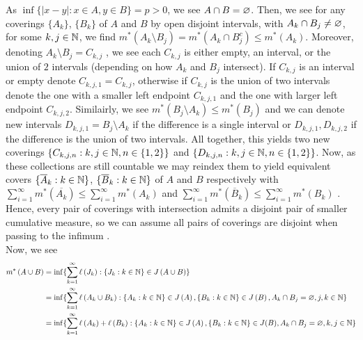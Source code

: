 \documentclass[a4paper]{article}
\begin{document}
\begin{solution}[28]
	As \(\inf \{ \left| x-y \right|  : x \in A, y \in B \} = p > 0\), we see \(A \cap B = \varnothing\). Then, we see for any coverings \(\{A_{k}\} \), \(\{B_{k}\} \) of \(A\) and \(B\) by open disjoint intervals, with \(A_{k} \cap B_{j} \neq \varnothing\), for some \(k, j \in \mathbb{N}\), we find \(m^{*}\left( A_{k} \setminus B_{j} \right)  = m^{*}\left( A_{k} \cap B_{j}^{c} \right)  \le m^{*}\left( A_{k} \right)   \). Moreover, denoting \(A_{k} \setminus B_{j} = C_{k,j}\) , we see each \(C_{k, j}\) is either empty, an interval, or the union of \(2\) intervals (depending on how \(A_{k}\) and \(B_{j}\) intersect). If \(C_{k, j}\) is an interval or empty denote \(C_{k, j, 1} = C_{k, j}\), otherwise if \(C_{k, j}\) is the union of two intervals denote the one with a smaller left endpoint \(C_{k, j, 1}\) and the one with larger left endpoint \(C_{k, j, 2}\). Similairly, we see \(m^{*}\left( B_{j} \setminus A_{k} \right) \le m^{*}\left( B_{j} \right) \) and we can denote new intervals \(D_{k, j, 1} = B_{j} \setminus A_{k}\) if the difference is a single interval or \(D_{k, j, 1}, D_{k, j, 2}\) if the difference is the union of two intervals. All together, this yields two new coverings \(\{C_{k, j, n} : k, j \in \mathbb{N}, n \in \{1, 2\} \}\) and \( \{D_{k, j, n} : k, j \in \mathbb{N}, n \in \{1, 2\} \}  \). Now, as these collections are still countable we may reindex them to yield equivalent covers \(\{\overline{A}_{k} : k \in \mathbb{N}\} \), \(\{\overline{B}_{k} : k \in \mathbb{N}\} \) of \(A\) and \(B\) respectively  with \(\sum_{i= 1}^{\infty} m^{*}(\overline{A_{k}}) \le \sum_{i= 1}^{\infty} m^{*}(A_{k})\)  and \(\sum_{i= 1}^{\infty} m^{*}\left( \overline{B}_{k} \right) \le \sum_{i= 1}^{\infty} m^{*}\left( B_{k} \right) \) . Hence, every pair of coverings with intersection admits a disjoint pair of smaller cumulative measure, so we can assume all pairs of coverings are disjoint when passing to the infimum .\\
	Now, we see
	\begin{align*}
		m^{*}\left( A \cup B \right) &=  \inf \{ \sum_{k= 1}^{\infty} \ell\left( J_{k} \right)  : \{J_{k} : k \in \N\} \in J\left( A \cup B \right)   \}  \\
					     &= \inf \{ \sum_{k= 1}^{\infty} \ell\left( A_{k} \cup B_{k} \right)  : \{A_{k} : k \in \N\} \in J\left( A \right) , \{B_{k} : k \in \N\} \in J\left( B \right) , A_{k} \cap B_{j} = \O, j, k \in \N  \}  \\
					     &= \inf \{ \sum_{k= 1}^{\infty} \ell\left( A_{k} \right)  + \ell\left( B_{k} \right)  : \{A_{k} : k \in \N\} \in J\left( A \right) , \{B_{k} : k \in \N\} \in J(B), A_{k} \cap B_{j} =\O, k, j \in \N  \}  \\

\end{align*}
\end{solution}
\end{document}
